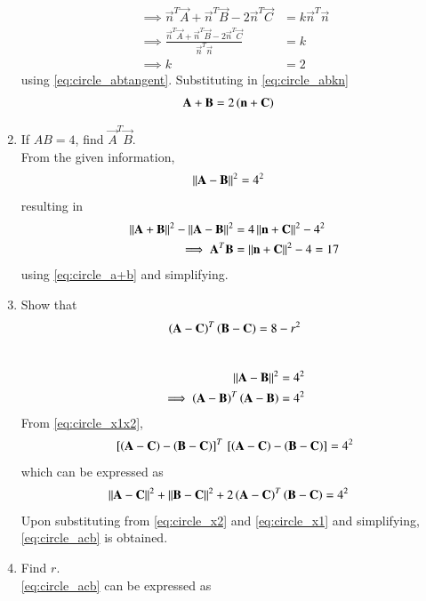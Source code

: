 \begin{enumerate}[label=\arabic*.,ref=\thesubsection.\theenumi]
\begin{align}
\\
\implies \vec{n}^T\vec{A}+\vec{n}^T\vec{B}-2\vec{n}^T\vec{C} &= k\vec{n}^T\vec{n}
\\
\implies \frac{\vec{n}^T\vec{A}+\vec{n}^T\vec{B}-2\vec{n}^T\vec{C}}{\vec{n}^T\vec{n}} &= k
\\
\implies k &= 2
\end{align}
using \eqref{eq:circle_abtangent}.
Substituting in \eqref{eq:circle_abkn}
\begin{align}
\mathbf{A}+\mathbf{B} &= 2\left(\mathbf{n}+\mathbf{C}\right)
\label{eq:circle_a+b}
\end{align}
%
\item If $AB = 4$, find $\vec{A}^T\vec{B}$.
%
\\
\solution From the given information,
\begin{align}
\left\lVert\mathbf{A}-\mathbf{B}\right\rVert^2 &= 4^2
\end{align}
resulting in
\begin{align}
\left\lVert\mathbf{A}+\mathbf{B}\right\rVert^2-\left\lVert\mathbf{A}-\mathbf{B}\right\rVert^2 &= 4\left\lVert\mathbf{n}+\mathbf{C}\right\rVert^2-4^2
\\
\implies\mathbf{A}^T\mathbf{B} &= \left\lVert\mathbf{n}+\mathbf{C}\right\rVert^2-4 = 17
\end{align}
using \eqref{eq:circle_a+b} and simplifying.
%
\item Show that
\begin{equation}
\label{eq:circle_acb}
\left(\mathbf{A}-\mathbf{C}\right)^T\left(\mathbf{B}-\mathbf{C}\right) =8 - r^2
\end{equation}
\\
\solution
\begin{align}
\left\lVert\mathbf{A}-\mathbf{B}\right\rVert^2 &= 4^2
\\
\implies\left(\mathbf{A}-\mathbf{B}\right)^T\left( \mathbf{A}-\mathbf{B} \right) &= 4^2
\label{eq:circle_x1x2}
\end{align}
%
From \eqref{eq:circle_x1x2},
\begin{align}
{}\left[\left(\mathbf{A}-\mathbf{C}\right)-\left(\mathbf{B}- \mathbf{C}\right)\right]^T{}\left[ 
\left(\mathbf{A}-\mathbf{C}\right)-\left(\mathbf{B}- \mathbf{C}\right)\right] = 4^2
\end{align}
%
which can be expressed as
\begin{align}
\left\lVert\mathbf{A}-\mathbf{C}\right\rVert^2+\left\lVert\mathbf{B}-\mathbf{C}\right\rVert^2 &
+ 2\left(\mathbf{A}-\mathbf{C}\right)^T\left(\mathbf{B}-\mathbf{C}\right) 
= 4^2
\end{align}
Upon substituting from \eqref{eq:circle_x2} and  \eqref{eq:circle_x1} and simplifying, \eqref{eq:circle_acb}
is obtained.
\item Find $r$.
\\
\solution \eqref{eq:circle_acb} can be expressed as

\end{enumerate}
